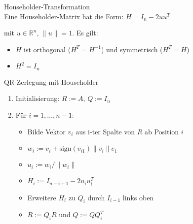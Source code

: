 \begin{definition}{Householder-Transformation}\\
Eine Householder-Matrix hat die Form:
$H = I_n - 2uu^T$

mit $u \in \mathbb{R}^n$, $\|u\| = 1$. Es gilt:
\begin{itemize}
    \item $H$ ist orthogonal ($H^T = H^{-1}$) und symmetrisch ($H^T = H$)
    \item $H^2 = I_n$
\end{itemize}
\end{definition}

\begin{KR}{QR-Zerlegung mit Householder}
\begin{enumerate}
    \item Initialisierung: $R := A$, $Q := I_n$
    \item Für $i = 1,\ldots,n-1$:
        \begin{itemize}
            \item Bilde Vektor $v_i$ aus i-ter Spalte von $R$ ab Position $i$
            \item $w_i := v_i + \text{sign}(v_{i1})\|v_i\|e_1$
            \item $u_i := w_i/\|w_i\|$
            \item $H_i := I_{n-i+1} - 2u_iu_i^T$
            \item Erweitere $H_i$ zu $Q_i$ durch $I_{i-1}$ links oben
            \item $R := Q_iR$ und $Q := QQ_i^T$
        \end{itemize}
\end{enumerate}
\end{KR}

